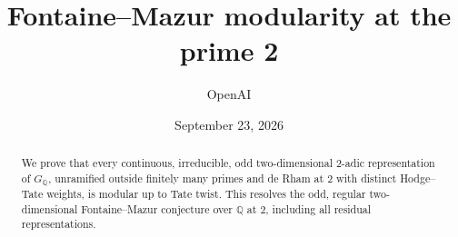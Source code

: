 \documentclass[11pt]{article}
\title{Fontaine--Mazur modularity at the prime 2}
\author{OpenAI}
\date{September 23, 2026}
\theoremstyle{definition}
\theoremstyle{remark}
\begin{document}
\maketitle
\begin{abstract}
We prove that every continuous, irreducible, odd two-dimensional
\(2\)-adic representation of \(G_{\mathbb Q}\), unramified outside
finitely many primes and de Rham at \(2\) with distinct Hodge--Tate
weights, is modular up to Tate twist. This resolves the odd, regular
two-dimensional Fontaine--Mazur conjecture over \(\mathbb Q\) at \(2\),
including all residual representations.
\end{abstract}


\clearpage
\begingroup
\small
\tableofcontents
\endgroup
\clearpage










\end{document}
